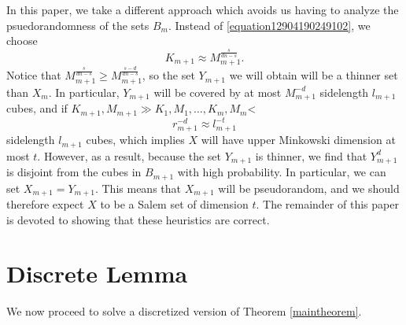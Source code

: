 \documentclass[12pt,reqno]{article}
\numberwithin{equation}{section}
\begin{document}
In this paper, we take a different approach which avoids us having to analyze the psuedorandomness of the sets $B_m$. Instead of \eqref{equation12904190249102}, we choose
%
\[ K_{m+1} \approx M_{m+1}^{\frac{s}{dn - s}}. \]
%
Notice that $M_{m+1}^{\frac{s}{dn - s}} \geq M_{m+1}^{\frac{s-d}{dn - s}}$, so the set $Y_{m+1}$ we will obtain will be a thinner set than $X_m$. In particular, $Y_{m+1}$ will be covered by at most $M_{m+1}^{-d}$ sidelength $l_{m+1}$ cubes, and if $K_{m+1}, M_{m+1} \gg K_1,M_1,\dots,K_m,M_m$< 
%
\[ r_{m+1}^{-d} \approx l_{m+1}^{-t} \]
%
sidelength $l_{m+1}$ cubes, which implies $X$ will have upper Minkowski dimension at most $t$. However, as a result, because the set $Y_{m+1}$ is thinner, we find that $Y_{m+1}^d$ is disjoint from the cubes in $B_{m+1}$ with high probability. In particular, we can set $X_{m+1} = Y_{m+1}$. This means that $X_{m+1}$ will be pseudorandom, and we should therefore expect $X$ to be a Salem set of dimension $t$. The remainder of this paper is devoted to showing that these heuristics are correct.

\section{Discrete Lemma}

We now proceed to solve a discretized version of Theorem \ref{maintheorem}.
\end{document}
